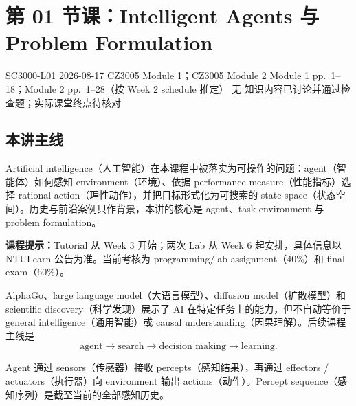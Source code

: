 
\section{第 01 节课：Intelligent Agents 与 Problem Formulation}
\label{lecture:SC3000-L01}

\lecturemeta
  {SC3000-L01}
  {2026-08-17}
  {CZ3005 Module 1；CZ3005 Module 2}
  {Module 1 pp.~1--18；Module 2 pp.~1--28（按 Week 2 schedule 推定）}
  {无}
  {知识内容已讨论并通过检查题；实际课堂终点待核对}

\subsection{本讲主线}

Artificial intelligence（人工智能）在本课程中被落实为可操作的问题：agent（智能体）如何感知 environment（环境）、依据 performance measure（性能指标）选择 rational action（理性动作），并把目标形式化为可搜索的 state space（状态空间）。历史与前沿案例只作背景，本讲的核心是 agent、task environment 与 problem formulation。

\textbf{课程提示：}Tutorial 从 Week 3 开始；两次 Lab 从 Week 6 起安排，具体信息以 NTULearn 公告为准。当前考核为 programming/lab assignment（40\%）和 final exam（60\%）。



AlphaGo、large language model（大语言模型）、diffusion model（扩散模型）和 scientific discovery（科学发现）展示了 AI 在特定任务上的能力，但不自动等价于 general intelligence（通用智能）或 causal understanding（因果理解）。后续课程主线是
\[
  \text{agent}\longrightarrow\text{search}\longrightarrow
  \text{decision making}\longrightarrow\text{learning}.
\]


Agent 通过 sensors（传感器）接收 percepts（感知结果），再通过 effectors / actuators（执行器）向 environment 输出 actions（动作）。Percept sequence（感知序列）是截至当前的全部感知历史。

